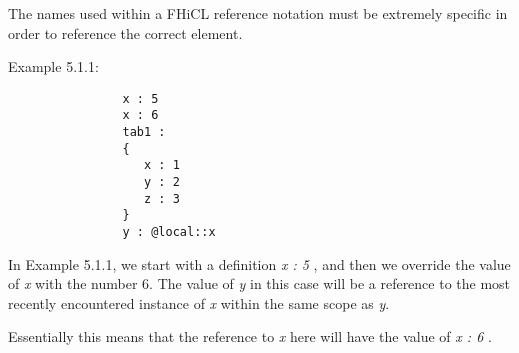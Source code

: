\documentclass{memarticle}
\begin{document}
        The names used within a FHiCL reference notation must be extremely specific in order to reference the correct element.
        \par
        Example 5.1.1:
        \begin{verbatim}
                x : 5
                x : 6
                tab1 :
                {
                   x : 1
                   y : 2
                   z : 3
                }
                y : @local::x
        \end{verbatim}
        \par
        In Example 5.1.1, we start with a definition \emph{ x : 5 },
        and then we override the value of \emph{x} with the number 6.
        The value of \emph{y} in this case will be a reference to the
        most recently encountered instance of \emph{x} within the same scope
        as \emph{y}.
        \par
        Essentially this means that the reference to \emph{x} here will have the value
        of \emph{ x : 6 }.
\end{document}
